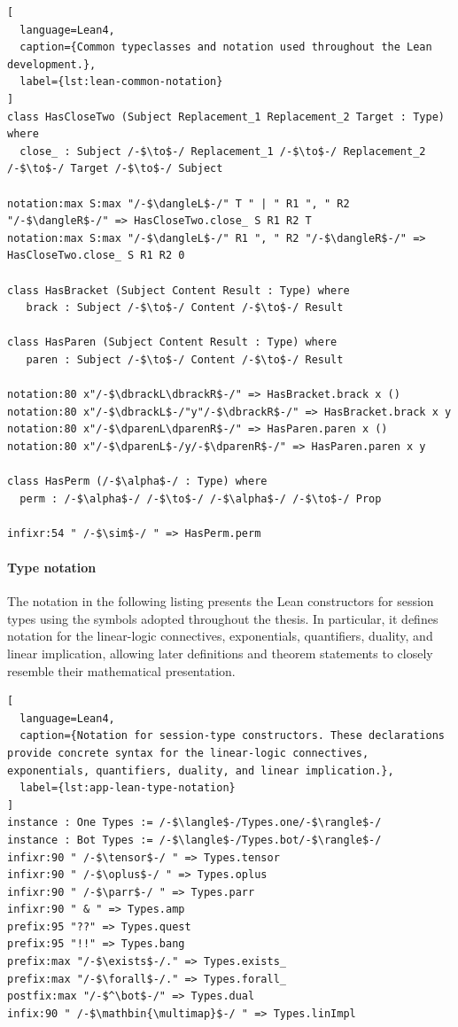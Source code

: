 \begin{lstlisting}[
  language=Lean4,
  caption={Common typeclasses and notation used throughout the Lean development.},
  label={lst:lean-common-notation}
]
class HasCloseTwo (Subject Replacement_1 Replacement_2 Target : Type) where
  close_ : Subject /-$\to$-/ Replacement_1 /-$\to$-/ Replacement_2 /-$\to$-/ Target /-$\to$-/ Subject

notation:max S:max "/-$\dangleL$-/" T " | " R1 ", " R2 "/-$\dangleR$-/" => HasCloseTwo.close_ S R1 R2 T
notation:max S:max "/-$\dangleL$-/" R1 ", " R2 "/-$\dangleR$-/" => HasCloseTwo.close_ S R1 R2 0

class HasBracket (Subject Content Result : Type) where
   brack : Subject /-$\to$-/ Content /-$\to$-/ Result

class HasParen (Subject Content Result : Type) where
   paren : Subject /-$\to$-/ Content /-$\to$-/ Result

notation:80 x"/-$\dbrackL\dbrackR$-/" => HasBracket.brack x ()
notation:80 x"/-$\dbrackL$-/"y"/-$\dbrackR$-/" => HasBracket.brack x y
notation:80 x"/-$\dparenL\dparenR$-/" => HasParen.paren x ()
notation:80 x"/-$\dparenL$-/y/-$\dparenR$-/" => HasParen.paren x y

class HasPerm (/-$\alpha$-/ : Type) where
  perm : /-$\alpha$-/ /-$\to$-/ /-$\alpha$-/ /-$\to$-/ Prop

infixr:54 " /-$\sim$-/ " => HasPerm.perm
\end{lstlisting}

\paragraph{Type notation}
The notation in the following listing presents the Lean constructors for session types using the symbols adopted throughout the thesis. In particular, it defines notation for the linear-logic connectives, exponentials, quantifiers, duality, and linear implication, allowing later definitions and theorem statements to closely resemble their mathematical presentation.

\begin{lstlisting}[
  language=Lean4,
  caption={Notation for session-type constructors. These declarations provide concrete syntax for the linear-logic connectives, exponentials, quantifiers, duality, and linear implication.},
  label={lst:app-lean-type-notation}
]
instance : One Types := /-$\langle$-/Types.one/-$\rangle$-/
instance : Bot Types := /-$\langle$-/Types.bot/-$\rangle$-/
infixr:90 " /-$\tensor$-/ " => Types.tensor
infixr:90 " /-$\oplus$-/ " => Types.oplus
infixr:90 " /-$\parr$-/ " => Types.parr
infixr:90 " & " => Types.amp
prefix:95 "??" => Types.quest
prefix:95 "!!" => Types.bang
prefix:max "/-$\exists$-/." => Types.exists_
prefix:max "/-$\forall$-/." => Types.forall_
postfix:max "/-$^\bot$-/" => Types.dual
infix:90 " /-$\mathbin{\multimap}$-/ " => Types.linImpl
\end{lstlisting}


